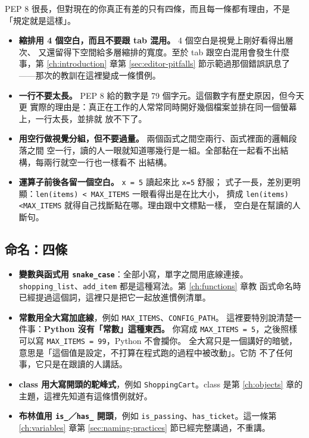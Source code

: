 PEP 8 很長，但對現在的你真正有差的只有四條，而且每一條都有理由，不是「規定就是這樣」。

\begin{itemize}
\item \textbf{縮排用 4 個空白，而且不要跟 tab 混用。} 4 個空白是視覺上剛好看得出層次、
又還留得下空間給多層縮排的寬度。至於 tab 跟空白混用會發生什麼事，第 \ref{ch:introduction}
章第 \ref{sec:editor-pitfalls} 節示範過那個錯誤訊息了——那次的教訓在這裡變成一條慣例。
\item \textbf{一行不要太長。} PEP 8 給的數字是 79 個字元。這個數字有歷史原因，但今天更
實際的理由是：真正在工作的人常常同時開好幾個檔案並排在同一個螢幕上，一行太長，並排就
放不下了。
\item \textbf{用空行做視覺分組，但不要過量。} 兩個函式之間空兩行、函式裡面的邏輯段落之間
空一行，讀的人一眼就知道哪幾行是一組。全部黏在一起看不出結構，每兩行就空一行也一樣看不
出結構。
\item \textbf{運算子前後各留一個空白。} \texttt{x = 5} 讀起來比 \texttt{x=5} 舒服；
式子一長，差別更明顯：\texttt{len(items) < MAX\_ITEMS} 一眼看得出是在比大小，
擠成 \texttt{len(items)<MAX\_ITEMS} 就得自己找斷點在哪。理由跟中文標點一樣，
空白是在幫讀的人斷句。
\end{itemize}

\subsection*{命名：四條}

\begin{itemize}
\item \textbf{變數與函式用 \texttt{snake\_case}}：全部小寫，單字之間用底線連接。
\texttt{shopping\_list}、\texttt{add\_item} 都是這種寫法。第 \ref{ch:functions} 章教
函式命名時已經提過這個詞，這裡只是把它一起放進慣例清單。
\item \textbf{常數用全大寫加底線}，例如 \texttt{MAX\_ITEMS}、\texttt{CONFIG\_PATH}。
這裡要特別說清楚一件事：\textbf{Python 沒有「常數」這種東西。} 你寫成
\texttt{MAX\_ITEMS = 5}，之後照樣可以寫 \texttt{MAX\_ITEMS = 99}，Python 不會攔你。
全大寫只是一個講好的暗號，意思是「這個值是設定，不打算在程式跑的過程中被改動」。它防
不了任何事，它只是在跟讀的人講話。
\item \textbf{class 用大寫開頭的駝峰式}，例如 \texttt{ShoppingCart}。class 是第
\ref{ch:objects} 章的主題，這裡先知道有這條慣例就好。
\item \textbf{布林值用 \texttt{is\_}／\texttt{has\_} 開頭}，例如
\texttt{is\_passing}、\texttt{has\_ticket}。這一條第 \ref{ch:variables} 章第
\ref{sec:naming-practices} 節已經完整講過，不重講。
\end{itemize}


